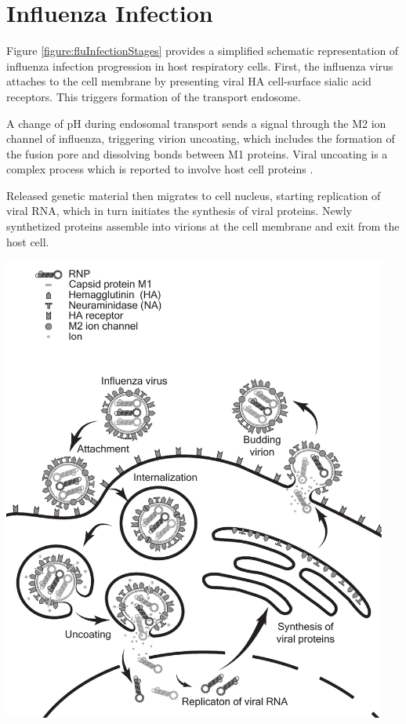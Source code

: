 \section{Influenza Infection}

Figure \ref{figure:fluInfectionStages} provides a simplified schematic representation of influenza infection progression in host respiratory cells. First, the influenza virus attaches to the cell membrane by presenting viral HA cell-surface sialic acid receptors. This triggers formation of the transport endosome.

A change of pH during endosomal transport sends a signal through the M2 ion channel of influenza, triggering virion uncoating, which includes the formation of the fusion pore and dissolving bonds between M1 proteins. Viral uncoating is a complex process which is reported to involve host cell proteins \cite{banerjee2014influenza}.

Released genetic material then migrates to cell nucleus, starting replication of viral RNA, which in turn initiates the synthesis of viral proteins. Newly synthetized proteins assemble into virions at the cell membrane and exit from the host cell.

\begin{center}
\includegraphics[width=0.95\textwidth, trim={0cm 0cm 0cm 0cm}, clip]{D_chapters/0_introduction/flu_stages.pdf}
\label{figure:fluInfectionStages}
\end{center}